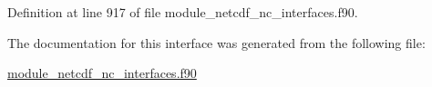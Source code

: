 Definition at line 917 of file module\+\_\+netcdf\+\_\+nc\+\_\+interfaces.\+f90.



The documentation for this interface was generated from the following file\+:\begin{DoxyCompactItemize}
\item 
\hyperlink{module__netcdf__nc__interfaces_8f90}{module\+\_\+netcdf\+\_\+nc\+\_\+interfaces.\+f90}\end{DoxyCompactItemize}

